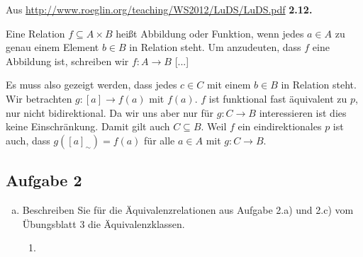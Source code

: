 \begin{enumerate}[a)]
  Aus \url{http://www.roeglin.org/teaching/WS2012/LuDS/LuDS.pdf}{ \textbf{2.12.}}

  \begin{definition}
  Eine Relation $f \subseteq A \times B $ heißt Abbildung oder Funktion, wenn
jedes $a \in A$ zu genau einem Element $b \in B$ in Relation steht. Um anzudeuten, dass $f$ eine Abbildung ist, schreiben wir $f: A \to B$ [...]
  \end{definition}

  Es muss also gezeigt werden, dass jedes $c \in C$ mit einem $b \in B$ in Relation steht. Wir betrachten $ g: [a] \to f(a) $ mit $f(a)$.  $f$ ist funktional fast äquivalent zu $p$, nur nicht bidirektional. Da wir uns aber nur für $g: C \to B$ interessieren ist dies keine Einschränkung. Damit gilt auch $C \subseteq B$. Weil $f$ ein eindirektionales $p$ ist auch, dass $g([a]_{\sim}) = f(a)$ für alle $a\in A$ mit $g: C \to B$.



  \end{enumerate}

  \subsection*{Aufgabe 2}

  \begin{enumerate}[a)]
    \item Beschreiben Sie für die Äquivalenzrelationen aus Aufgabe 2.a) und 2.c) vom Übungsblatt 3 die Äquivalenzklassen.
      \begin{enumerate}
        \item
      \end{enumerate}
  \end{enumerate}



